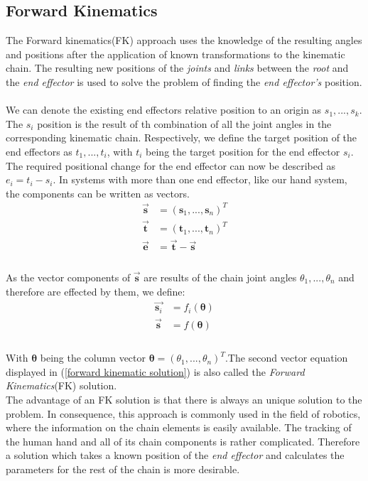  \subsection{Forward Kinematics}
  \label{sec:Forward Kinematics} 
The Forward kinematics(FK) approach uses the knowledge of the resulting angles and positions after the application of known transformations to the kinematic chain. The resulting new positions of the \textit{joints} and \textit{links} between the \textit{root} and the \textit{end effector} is used to solve the problem of finding the \textit{end effector's} position.\\\\
We can denote the existing end effectors relative position to an origin as $ s_{1},...,s_{k}$. The $s_{i}$ position is the result of th combination of all the joint angles in the corresponding kinematic chain. Respectively, we define the target position of the end effectors as $t_{1},...,t_{i}$, with $t_{i}$ being the target position for the end effector $s_{i}$. The required positional change for the end effector can now be described as $e_{i}=t_{i}-s_{i}$. In systems with more than one end effector, like our hand system, the components can be written as vectors.\\
\begin{equation}
\label{fk components}
\begin{split}
\vec{\textbf{s}}&=(\textbf{s}_{1},...,\textbf{s}_{n})^{T}\\
\vec{\textbf{t}}&=(\textbf{t}_{1},...,\textbf{t}_{n})^{T}\\
\vec{\textbf{e}}&= \vec{\textbf{t}}-\vec{\textbf{s}}\\
\end{split}
\end{equation}
\\As the vector components of $\vec{\textbf{s}}$ are results of the chain joint angles $\theta_{1},...,\theta_{n}$ and therefore are effected by them, we define: \\
\begin{equation}
\label{forward kinematic solution}
\begin{split}
\vec{\textbf{s}_{i}}&=f_{i}(\pmb{\theta})\\
\vec{\textbf{s}}&=f(\pmb{\theta})\\
\end{split}
\end{equation}
\\With $\pmb{\theta}$ being the column vector $\pmb{\theta}=(\theta_{1},...,\theta_{n})^{T}$.The second vector equation displayed in (\ref{forward kinematic solution}) is also called the \textit{Forward Kinematics}(FK) solution.\\
The advantage of an FK solution is that there is always an unique solution to the problem. In consequence, this approach is commonly used in the field of robotics, where the information on the chain elements is easily available.
The tracking of the human hand and all of its chain components is rather complicated. Therefore a solution which takes a known position of the \textit{end effector} and calculates the parameters for the rest of the chain is more desirable.
